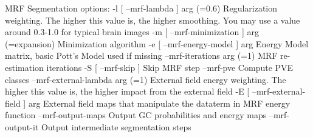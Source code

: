 MRF Segmentation options:
  -l [ --mrf-lambda ] arg (=0.6)        Regularization weighting. The higher 
                                        this value is, the higher smoothing. 
                                        You may use a value around 0.3-1.0 for 
                                        typical brain images
  -m [ --mrf-minimization ] arg (=expansion)
                                        Minimization algorithm
  -e [ --mrf-energy-model ] arg         Energy Model matrix, basic Pott's Model
                                        used if missing
  --mrf-iterations arg (=1)             MRF re-estimation iterations
  -S [ --mrf-skip ]                     Skip MRF step
  --mrf-pve                             Compute PVE classes
  --mrf-external-lambda arg (=1)        External field energy weighting. The 
                                        higher this value is, the higher impact
                                        from the external field
  -E [ --mrf-external-field ] arg       External field maps that manipulate the
                                        dataterm in MRF energy function
  --mrf-output-maps                     Output GC probabilities and energy maps
  --mrf-output-it                       Output intermediate segmentation steps

